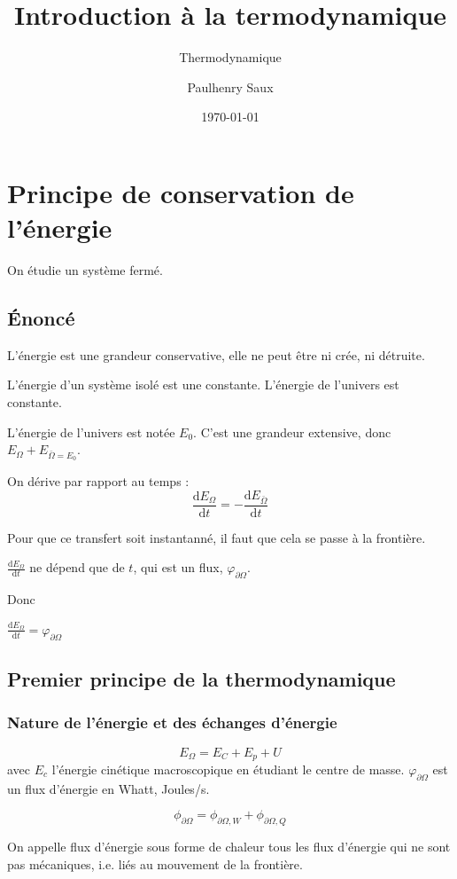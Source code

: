 \documentclass[french]{yLectureNote}
\title{Introduction à la termodynamique}
\subtitle{Thermodynamique}
\author{Paulhenry Saux}
\date{\today}
\newcommand{\dd}[0]{\mathrm{d}}
\begin{document}
\setcounter{chapter}{2}
\chapter{Principe de conservation de l'énergie}
On étudie un système fermé.
\section{Énoncé}
\begin{theorem}
    L'énergie est une grandeur conservative, elle ne peut \^etre ni crée, ni détruite.
\end{theorem}
\begin{theorem}
    L'énergie d'un système isolé est une constante. L'énergie de l'univers est constante.
\end{theorem}
L'énergie de l'univers est notée $E_0$. C'est une grandeur extensive, donc $E_{\Omega}+E_{\bar{\Omega} = E_0}$.

On dérive par rapport au temps :
$$\frac{\dd E_{\Omega}}{\dd t}= -\frac{\dd E_{\bar{\Omega}}}{\dd t}$$

Pour que ce transfert soit instantanné, il faut que cela se passe à la frontière.

$\frac{\dd E_{\Omega}}{\dd t}$ ne dépend que de $t$, qui est un flux, $\varphi_{\partial \Omega}$.

Donc 
\begin{theorem}
    $\frac{\dd E_{\Omega}}{\dd t} = \varphi_{\partial \Omega}$
\end{theorem}
\section{Premier principe de la thermodynamique}
\subsection{Nature de l'énergie et des échanges d'énergie}
$$E_{\Omega} = E_{C} + E_p + U$$ avec $E_c$ l'énergie cinétique macroscopique en étudiant le centre de masse.
$\varphi_{\partial \Omega}$ est un flux d'énergie en Whatt, Joules/s.

$$\phi_{\partial \Omega} = \phi_{\partial \Omega, W} + \phi_{\partial \Omega, Q}$$
\begin{definition}
    On appelle flux d'énergie sous forme de chaleur tous les flux d'énergie qui ne
    sont pas mécaniques, i.e. liés au mouvement de la frontière.
\end{definition}
\end{document}
